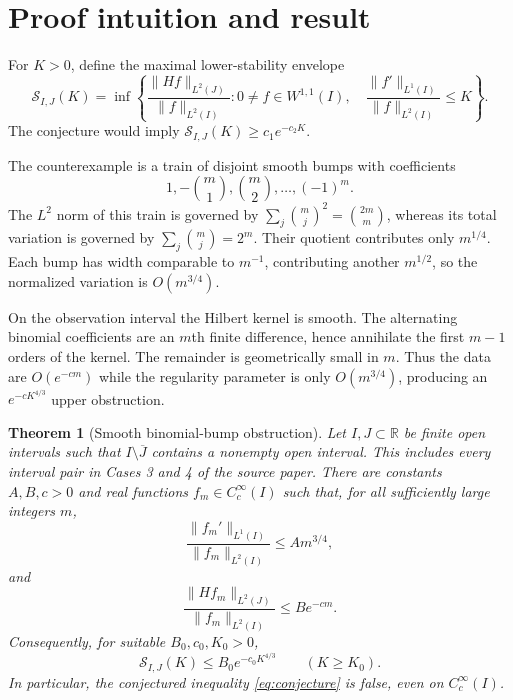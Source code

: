 \documentclass[11pt]{article}
\newtheorem{theorem}{Theorem}
\newcommand{\R}{\mathbb R}
\begin{document}
\section{Proof intuition and result}

For $K>0$, define the maximal lower-stability envelope
\begin{equation}\label{eq:envelope}
 \mathcal S_{I,J}(K)=
 \inf\left\{
 \frac{\|Hf\|_{L^2(J)}}{\|f\|_{L^2(I)}}:
 0\ne f\in W^{1,1}(I),\quad
 \frac{\|f'\|_{L^1(I)}}{\|f\|_{L^2(I)}}\le K
 \right\}.
\end{equation}
The conjecture would imply
$\mathcal S_{I,J}(K)\ge c_1e^{-c_2K}$.

The counterexample is a train of disjoint smooth bumps with coefficients
\[
 1,-\binom m1,\binom m2,\ldots,(-1)^m.
\]
The $L^2$ norm of this train is governed by
$\sum_j\binom mj^2=\binom{2m}m$, whereas its total variation is governed by
$\sum_j\binom mj=2^m$.  Their quotient contributes only $m^{1/4}$.
Each bump has width comparable to $m^{-1}$, contributing another $m^{1/2}$,
so the normalized variation is $O(m^{3/4})$.

On the observation interval the Hilbert kernel is smooth.  The alternating
binomial coefficients are an $m$th finite difference, hence annihilate the
first $m-1$ orders of the kernel.  The remainder is geometrically small in
$m$.  Thus the data are $O(e^{-cm})$ while the regularity parameter is only
$O(m^{3/4})$, producing an $e^{-cK^{4/3}}$ upper obstruction.

\begin{theorem}[Smooth binomial-bump obstruction]\label{thm:main}
Let $I,J\subset\R$ be finite open intervals such that
$I\setminus\overline J$ contains a nonempty open interval.  This includes
every interval pair in Cases 3 and 4 of the source paper.  There are constants
$A,B,c>0$ and real functions $f_m\in C_c^\infty(I)$ such that, for all
sufficiently large integers $m$,
\begin{equation}\label{eq:kappa}
 \frac{\|f_m'\|_{L^1(I)}}{\|f_m\|_{L^2(I)}}
   \le A m^{3/4},
\end{equation}
and
\begin{equation}\label{eq:delta}
 \frac{\|Hf_m\|_{L^2(J)}}{\|f_m\|_{L^2(I)}}
   \le B e^{-cm}.
\end{equation}
Consequently, for suitable $B_0,c_0,K_0>0$,
\begin{equation}\label{eq:fourthirds}
 \mathcal S_{I,J}(K)\le B_0e^{-c_0K^{4/3}}
 \qquad(K\ge K_0).
\end{equation}
In particular, the conjectured inequality \emph{\eqref{eq:conjecture}} is
false, even on $C_c^\infty(I)$.
\end{theorem}
\end{document}
